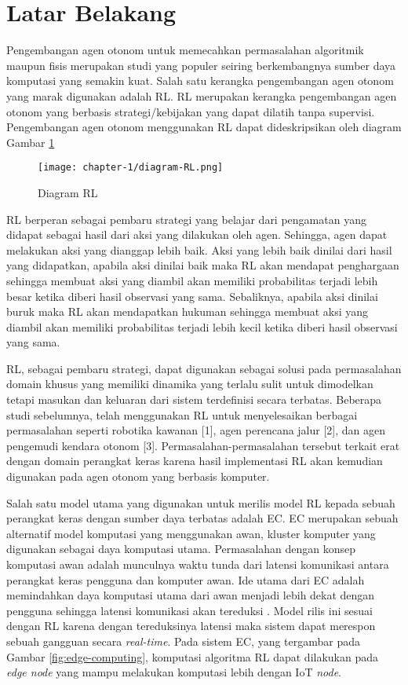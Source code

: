 \section{Latar Belakang}

Pengembangan agen otonom untuk memecahkan permasalahan algoritmik maupun fisis merupakan studi yang populer seiring berkembangnya sumber daya komputasi yang semakin kuat. Salah satu kerangka pengembangan agen otonom yang marak digunakan adalah \ac{RL}. \ac{RL} merupakan kerangka pengembangan agen otonom yang berbasis strategi/kebijakan yang dapat dilatih tanpa supervisi. Pengembangan agen otonom menggunakan \ac{RL} dapat dideskripsikan oleh diagram Gambar \ref{fig:RL-diagram}

\begin{figure}[h]
	\centering
	\texttt{[image: chapter-1/diagram-RL.png]}
	\caption{Diagram \acl{RL}}
	\label{fig:RL-diagram}
\end{figure}

\ac{RL} berperan sebagai pembaru strategi yang belajar dari pengamatan yang didapat sebagai hasil dari aksi yang dilakukan oleh agen. Sehingga, agen dapat melakukan aksi yang dianggap lebih baik. Aksi yang lebih baik dinilai dari hasil yang didapatkan, apabila aksi dinilai baik maka \ac{RL} akan mendapat penghargaan sehingga membuat aksi yang diambil akan memiliki probabilitas terjadi lebih besar ketika diberi hasil observasi yang sama. Sebaliknya, apabila aksi dinilai buruk maka \ac{RL} akan mendapatkan hukuman sehingga membuat aksi yang diambil akan memiliki probabilitas terjadi lebih kecil ketika diberi hasil observasi yang sama.

\ac{RL}, sebagai pembaru strategi, dapat digunakan sebagai solusi pada permasalahan domain khusus yang memiliki dinamika yang terlalu sulit untuk dimodelkan tetapi masukan dan keluaran dari sistem terdefinisi secara terbatas. Beberapa studi sebelumnya, telah menggunakan RL untuk menyelesaikan berbagai permasalahan seperti robotika kawanan [1], agen perencana jalur [2], dan agen pengemudi kendara otonom [3]. Permasalahan-permasalahan tersebut terkait erat dengan domain perangkat keras karena hasil implementasi RL akan kemudian digunakan pada agen otonom yang berbasis komputer.

Salah satu model utama yang digunakan untuk merilis model RL kepada sebuah perangkat keras dengan sumber daya terbatas adalah \ac{EC}. \ac{EC} merupakan sebuah alternatif model komputasi yang menggunakan awan, kluster komputer yang digunakan sebagai daya komputasi utama. Permasalahan dengan konsep komputasi awan adalah munculnya waktu tunda dari latensi komunikasi antara perangkat keras pengguna dan komputer awan. Ide utama dari \ac{EC} adalah memindahkan daya komputasi utama dari awan menjadi lebih dekat dengan pengguna sehingga latensi komunikasi akan tereduksi \parencite{edgecomputing}. Model rilis ini sesuai dengan RL karena dengan tereduksinya latensi maka sistem dapat merespon sebuah gangguan secara \textit{real-time}. Pada sistem \ac{EC}, yang tergambar pada Gambar \ref{fig:edge-computing}, komputasi algoritma RL dapat dilakukan pada \textit{edge node} yang mampu melakukan komputasi lebih dengan \ac{IoT} \textit{node}.

